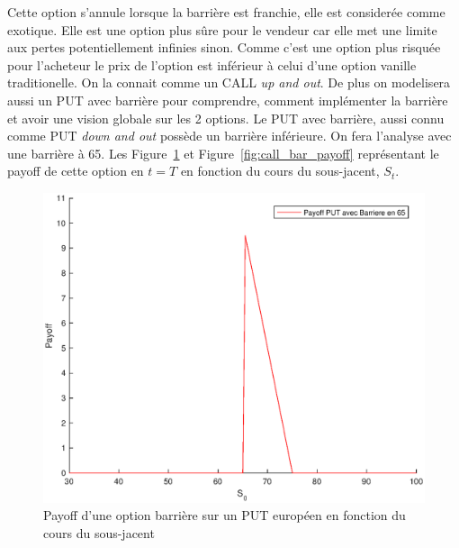 

Cette option s'annule  lorsque la barrière est franchie, elle est considerée comme exotique. Elle est une option plus sûre pour le vendeur car elle met une limite aux pertes potentiellement infinies sinon. Comme c'est une option plus risquée pour l'acheteur le prix de l'option est inférieur à celui d'une option vanille traditionelle. On la connait comme un CALL {\slshape up and out}. De plus on modelisera aussi un PUT avec barrière pour comprendre, comment implémenter la barrière et avoir une vision globale sur les 2 options. Le PUT avec barrière, aussi connu comme PUT {\slshape down and out} possède un barrière inférieure. On fera l'analyse avec une barrière à 65. Les Figure~\ref{fig:put_bar_payoff} et Figure~\ref{fig:call_bar_payoff} représentant le payoff de cette option en $t=T$ en fonction du cours du sous-jacent, $S_t$.

\begin{figure}[H]
\centering
\includegraphics[scale=0.5]{./img/PUT_BAR_PAYOFF.eps}
\caption{Payoff d'une option barrière sur un PUT européen  en fonction du cours du sous-jacent}
\label{fig:put_bar_payoff}
\end{figure}

